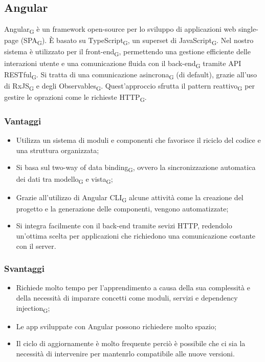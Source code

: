 \subsection{Angular}
Angular\textsubscript{G} è un framework open-source per lo sviluppo di applicazioni web single-page (SPA\textsubscript{G}). È basato su TypeScript\textsubscript{G}, un superset di JavaScript\textsubscript{G}. Nel nostro sistema è utilizzato per il front-end\textsubscript{G}, permettendo una gestione efficiente delle interazioni utente e una comunicazione fluida con il back-end\textsubscript{G} tramite API RESTful\textsubscript{G}. Si tratta di una comunicazione asincrona\textsubscript{G} (di default), grazie all'uso di RxJS\textsubscript{G} e degli Observables\textsubscript{G}. Quest'approccio sfrutta il pattern reattivo\textsubscript{G} per gestire le oprazioni come le richieste HTTP\textsubscript{G}. 
\subsubsection{Vantaggi}
\begin{itemize}
    \item Utilizza un sistema di moduli e componenti che favorisce il riciclo del codice e una struttura organizzata;
    \item Si basa sul two-way of data binding\textsubscript{G}, ovvero la sincronizzazione automatica dei dati tra modello\textsubscript{G} e vista\textsubscript{G};
    \item Grazie all'utilizzo di Angular CLI\textsubscript{G} alcune attività come la creazione del progetto e la generazione delle componenti, vengono automatizzate;
    \item Si integra facilmente con il back-end tramite sevizi HTTP, redendolo un'ottima scelta per applicazioni che richiedono una comunicazione costante con il server.
\end{itemize}
\subsubsection{Svantaggi}
\begin{itemize}
    \item Richiede molto tempo per l'apprendimento a causa della sua complessità e della necessità di imparare concetti come moduli, servizi e dependency injection\textsubscript{G};
    \item Le app sviluppate con Angular possono richiedere molto spazio;
    \item Il ciclo di aggiornamente è molto frequente perciò è possibile che ci sia la necessità di intervenire per mantenrlo compatibile alle nuove versioni.
\end{itemize}

